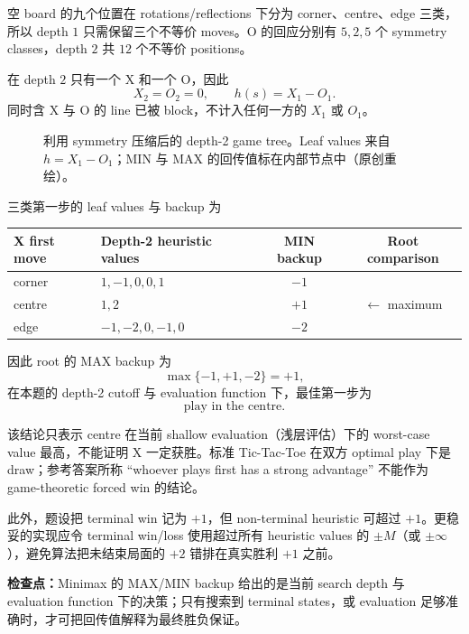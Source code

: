 \begin{checkedsolution}
空 board 的九个位置在 rotations/reflections 下分为 corner、centre、edge 三类，所以 depth $1$ 只需保留三个不等价 moves。O 的回应分别有 $5,2,5$ 个 symmetry classes，depth $2$ 共 $12$ 个不等价 positions。

在 depth $2$ 只有一个 X 和一个 O，因此
\[
  X_2=O_2=0,
  \qquad
  \boxed{h(s)=X_1-O_1}.
\]
同时含 X 与 O 的 line 已被 block，不计入任何一方的 $X_1$ 或 $O_1$。

\begin{figure}[htbp]
  \centering
  \resizebox{0.98\textwidth}{!}{}
  \caption{利用 symmetry 压缩后的 depth-2 game tree。Leaf values 来自 $h=X_1-O_1$；MIN 与 MAX 的回传值标在内部节点中（原创重绘）。}
  \label{fig:sc3000-tut02-tictactoe-tree}
\end{figure}

三类第一步的 leaf values 与 backup 为
\begin{center}
\small
\begin{tabularx}{0.94\textwidth}{@{}lXcc@{}}
  \toprule
  X first move & Depth-2 heuristic values & MIN backup & Root comparison \\
  \midrule
  corner & $1,-1,0,0,1$ & $-1$ & \\
  centre & $1,2$ & $+1$ & $\leftarrow$ maximum \\
  edge & $-1,-2,0,-1,0$ & $-2$ & \\
  \bottomrule
\end{tabularx}
\end{center}
因此 root 的 MAX backup 为
\[
  \max\{-1,+1,-2\}=\boxed{+1},
\]
在本题的 depth-2 cutoff 与 evaluation function 下，最佳第一步为
\[
  \boxed{\text{play in the centre}}.
\]

该结论只表示 centre 在当前 shallow evaluation（浅层评估）下的 worst-case value 最高，不能证明 X 一定获胜。标准 Tic-Tac-Toe 在双方 optimal play 下是 draw；参考答案所称 ``whoever plays first has a strong advantage'' 不能作为 game-theoretic forced win 的结论。

此外，题设把 terminal win 记为 $+1$，但 non-terminal heuristic 可超过 $+1$。更稳妥的实现应令 terminal win/loss 使用超过所有 heuristic values 的 $\pm M$（或 $\pm\infty$），避免算法把未结束局面的 $+2$ 错排在真实胜利 $+1$ 之前。
\end{checkedsolution}

\textbf{检查点：}Minimax 的 MAX/MIN backup 给出的是当前 search depth 与 evaluation function 下的决策；只有搜索到 terminal states，或 evaluation 足够准确时，才可把回传值解释为最终胜负保证。

